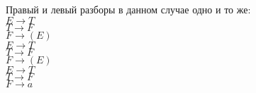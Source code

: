 \documentclass[a4paper,12pt]{article}
\begin{document}
Правый и левый разборы в данном случае одно и то же:\\
$E\rightarrow T$\\
$T\rightarrow F$\\
$F\rightarrow (E)$\\
$E\rightarrow T$\\
$T\rightarrow F$\\
$F\rightarrow (E)$\\
$E\rightarrow T$\\
$T\rightarrow F$\\
$F\rightarrow a$\\
\end{document}
